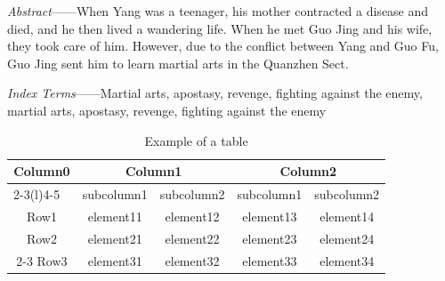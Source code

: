 \documentclass[doctor, vlined, ]{DissertUESTC}
\begin{document}

	\textit{Abstract}——When Yang was a teenager, his mother contracted a disease and died, and he then lived a wandering life. When he met Guo Jing and his wife, they took care of him. However, due to the conflict between Yang and Guo Fu, Guo Jing sent him to learn martial arts in the Quanzhen Sect.

	\textit{Index Terms}——Martial arts, apostasy, revenge, fighting against the enemy, martial arts, apostasy, revenge, fighting against the enemy


	\begin{table}[htp]
		\captionsetup{list=no}%
		\caption{Example of a table}
		\begin{tabular}{ccccc}
			\toprule
			\multirow{2}{*}{Column0} &  \multicolumn{2}{c}{Column1\tnote{1}} & \multicolumn{2}{c}{Column2\tnote{2}} \\
			\cmidrule(lr){2-3}\cmidrule(l){4-5}
			~     & subcolumn1 & subcolumn2 & subcolumn1 & subcolumn2 \\
			\midrule
			Row1  & element11 & element12 &element13 & element14 \\
			Row2  & element21 & element22 &element23 & element24 \\
			\cmidrule{2-3}\cmidrule{4-5}
			Row3  & element31 & element32 &element33 & element34 \\
			\bottomrule
		\end{tabular}
	\end{table}




\end{document}
